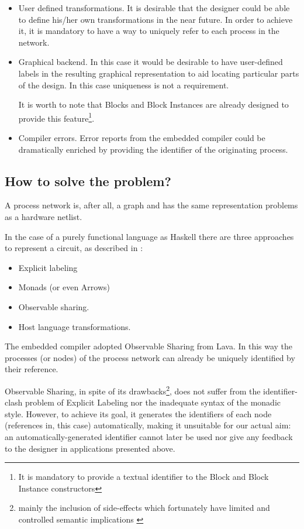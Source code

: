 \documentclass[a4paper,twoside,11pt]{article}
\begin{document}
\begin{itemize}
  \item User defined transformations. It is desirable that the designer
    could be able to define his/her own transformations in the near future.
    In order to achieve it, it is mandatory to have a way to
    uniquely refer to each process in the network.
  \item Graphical backend. In this case it would be desirable to have
    user-defined labels in the resulting graphical representation
    to aid locating particular parts of the design. In this case
    uniqueness is not a requirement. 
    
    It is worth to note that Blocks and Block Instances are already designed
    to provide this feature\footnote{It is mandatory to provide a textual
      identifier to the Block and Block Instance constructors}.
  \item Compiler errors. Error reports from the embedded compiler could be
    dramatically enriched by providing the identifier of the originating
    process.
\end{itemize}



\subsection{How to solve the problem?}

A process network is, after all, a graph and has the same representation
problems as a hardware netlist.

In the case of a purely functional language as Haskell there are three
approaches to represent a circuit, as described in \cite[section
2.4.1]{forsyde:synthesis}:

\begin{itemize}
  \item Explicit labeling
  \item Monads (or even Arrows)
  \item Observable sharing.
  \item Host language transformations.
\end{itemize}

The embedded compiler adopted Observable Sharing \cite{osharing} from Lava. In
this way the processes (or nodes) of the process network can already be
uniquely identified by their reference.

Observable Sharing, in spite of its drawbacks\footnote{mainly the inclusion of
  side-effects which fortunately have limited and controlled semantic
  implications \cite[section 4]{osharing}}, does not suffer from the
identifier-clash problem of Explicit Labeling nor the inadequate syntax of the
monadic style. However, to achieve its goal, it generates the identifiers of
each node (references in, this case) automatically, making it unsuitable for
our actual aim: an automatically-generated identifier cannot later be used nor
give any feedback to the designer in applications presented above.
\end{document}
